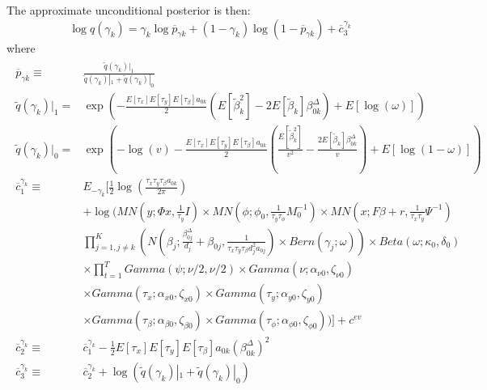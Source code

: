 \documentclass[11pt]{article}
\begin{document}
The approximate unconditional posterior is then:
\begin{equation}
	\log q\left(\gamma_{k}\right) = \gamma_{k}\log\overline{p}_{\gamma k}+\left(1-\gamma_{k}\right)\log\left(1-\overline{p}_{\gamma k}\right)+\overline{c}_{3}^{\gamma_{k}}
\end{equation}
where
\begin{align*}
\begin{split}
	\overline{p}_{\gamma k}\equiv&\frac{\tilde{q}\left(\gamma_{k}\right)|_{1}}{\tilde{q}\left(\gamma_{k}\right)|_{1}+\tilde{q}\left(\gamma_{k}\right)|_{0}}\\\tilde{q}\left(\gamma_{k}\right)|_{1}=&\exp\left(-\frac{E\left[\tau_{x}\right]E\left[\tau_{y}\right]E\left[\tau_{\beta}\right]a_{0k}}{2}\left(E\left[\tilde{\beta}_{k}^{2}\right]-2E\left[\tilde{\beta}_{k}\right]\beta_{0k}^{\Delta}\right)+E\left[\log\left(\omega\right)\right]\right)\\\tilde{q}\left(\gamma_{k}\right)|_{0}=&\exp\left(-\log\left(v\right)-\frac{E\left[\tau_{x}\right]E\left[\tau_{y}\right]E\left[\tau_{\beta}\right]a_{0k}}{2}\left(\frac{E\left[\tilde{\beta}_{k}^{2}\right]}{v^{2}}-\frac{2E\left[\tilde{\beta}_{k}\right]\beta_{0k}^{\Delta}}{v}\right)+E\left[\log\left(1-\omega\right)\right]\right)\\\overline{c}_{1}^{\gamma_{k}}\equiv&E_{-\gamma_{k}}\Bigg[\frac{1}{2}\log\left(\frac{\tau_{x}\tau_{y}\tau_{\beta}a_{0k}}{2\pi}\right)\\&+\log\Bigg(MN\left(y;\Phi x,\frac{1}{\tau_{y}}I\right)\times MN\left(\phi;\phi_{0},\frac{1}{\tau_{y}\tau_{\phi}}M_{0}^{-1}\right)\times MN\left(x;F\beta+r,\frac{1}{\tau_{x}\tau_{y}}\Psi^{-1}\right)\\&\prod_{j=1,j\ne k}^{K}\left(N\left(\beta_{j};\frac{\beta_{0j}^{\Delta}}{d_{j}}+\beta_{0j},\frac{1}{\tau_{x}\tau_{y}\tau_{\beta}d_{j}^{2}a_{0j}}\right)\times Bern\left(\gamma_{j};\omega\right)\right)\times Beta\left(\omega;\kappa_{0},\delta_{0}\right)\\&\times\prod_{t=1}^{T}Gamma\left(\psi;\nu/2,\nu/2\right)\times Gamma\left(\nu;\alpha_{\nu0},\zeta_{\nu0}\right)\\&\times Gamma\left(\tau_{x};\alpha_{x0},\zeta_{x0}\right)\times Gamma\left(\tau_{y};\alpha_{y0},\zeta_{y0}\right)\\&\times Gamma\left(\tau_{\beta};\alpha_{\beta0},\zeta_{\beta0}\right)\times Gamma\left(\tau_{\phi};\alpha_{\phi0},\zeta_{\phi0}\right)\Bigg)\Bigg]+c^{ev}\\\overline{c}_{2}^{\gamma_{k}}\equiv&\overline{c}_{1}^{\gamma_{k}}-\frac{1}{2}E\left[\tau_{x}\right]E\left[\tau_{y}\right]E\left[\tau_{\beta}\right]a_{0k}\left(\beta_{0k}^{\Delta}\right)^{2}\\\overline{c}_{3}^{\gamma_{k}}\equiv&\overline{c}_{2}^{\gamma_{k}}+\log\left(\tilde{q}\left(\gamma_{k}\right)|_{1}+\tilde{q}\left(\gamma_{k}\right)|_{0}\right)
\end{split}
\end{align*}
\end{document}

